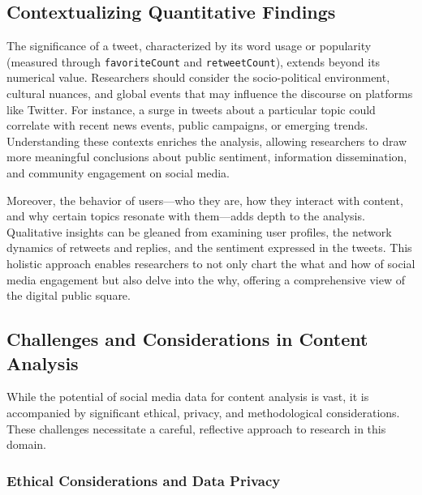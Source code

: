 \documentclass[
]{book}
\begin{document}
\hypertarget{contextualizing-quantitative-findings}{%
\subsection{Contextualizing Quantitative Findings}\label{contextualizing-quantitative-findings}}

The significance of a tweet, characterized by its word usage or popularity (measured through \texttt{favoriteCount} and \texttt{retweetCount}), extends beyond its numerical value. Researchers should consider the socio-political environment, cultural nuances, and global events that may influence the discourse on platforms like Twitter. For instance, a surge in tweets about a particular topic could correlate with recent news events, public campaigns, or emerging trends. Understanding these contexts enriches the analysis, allowing researchers to draw more meaningful conclusions about public sentiment, information dissemination, and community engagement on social media.

Moreover, the behavior of users---who they are, how they interact with content, and why certain topics resonate with them---adds depth to the analysis. Qualitative insights can be gleaned from examining user profiles, the network dynamics of retweets and replies, and the sentiment expressed in the tweets. This holistic approach enables researchers to not only chart the what and how of social media engagement but also delve into the why, offering a comprehensive view of the digital public square.

\hypertarget{challenges-and-considerations-in-content-analysis}{%
\subsection{Challenges and Considerations in Content Analysis}\label{challenges-and-considerations-in-content-analysis}}

While the potential of social media data for content analysis is vast, it is accompanied by significant ethical, privacy, and methodological considerations. These challenges necessitate a careful, reflective approach to research in this domain.

\hypertarget{ethical-considerations-and-data-privacy}{%
\subsubsection{Ethical Considerations and Data Privacy}\label{ethical-considerations-and-data-privacy}}
\end{document}
